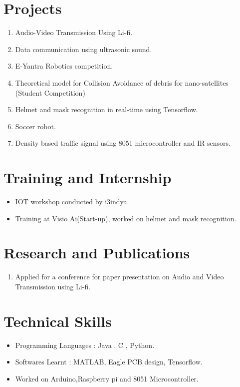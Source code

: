 \documentclass{article}
\begin{document}
	\section{Projects}
	\begin{enumerate}
		\item Audio-Video Transmission Using Li-fi.
		\item Data communication using ultrasonic sound.
		\item E-Yantra Robotics competition.
		\item Theoretical model for Collision Avoidance of debris for nano-satellites (Student Competition)
		\item Helmet and mask recognition in real-time using Tensorflow.
		\item Soccer robot.
		\item Density based traffic signal using 8051 microcontroller and IR sensors.
	\end{enumerate}

	\section{Training and Internship}
	\begin{itemize}
		\item IOT workshop conducted by i3indya.
		\item Training at Visio Ai(Start-up), worked on helmet and mask recognition.
	\end{itemize}

	\section{Research and Publications}
	\begin{enumerate}
		\item Applied for a conference for paper presentation on Audio and Video Transmission using Li-fi.
	\end{enumerate}

	\section{Technical Skills}
	\begin{itemize}
		\item Programming Languages : Java , C , Python.
		\item Softwares Learnt : MATLAB, Eagle PCB design, Tensorflow.
		\item Worked on Arduino,Raspberry pi and 8051 Microcontroller.
	\end{itemize}
\end{document}
